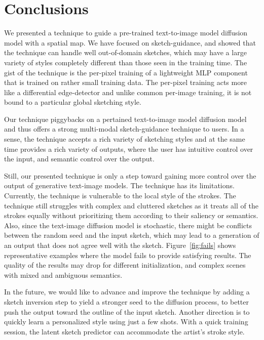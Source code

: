 \section{Conclusions}

We presented a technique to guide a pre-trained text-to-image model diffusion model with a spatial map. We have focused on sketch-guidance, and showed that the technique can handle well out-of-domain sketches, which may have a large variety of styles completely different than those seen in the training time. The gist of the technique is the per-pixel training of a lightweight MLP component that is trained on rather small training data. The per-pixel training acts more like a differential edge-detector and unlike common per-image training, it is not bound to a particular global sketching style.

Our technique piggybacks on a pertained text-to-image model diffusion model and thus offers a strong multi-modal sketch-guidance technique to users. In a sense, the technique accepts a rich variety of sketching styles and at the same time provides a rich variety of outputs, where the user has intuitive control over the input, and semantic control over the output.

Still, our presented technique is only a step toward gaining more control over the output of generative text-image models. The technique has its limitations. Currently, the technique is vulnerable to the local style of the strokes. The technique still struggles with complex and cluttered sketches as it treats all of the strokes equally without prioritizing them according to their saliency or semantics. Also, since the text-image diffusion model is stochastic, there might be conflicts between the random seed and the input sketch, which may lead to a generation of an output that does not agree well with the sketch. Figure~\ref{fig:fails} shows representative examples where the model fails to provide satisfying results. The quality of the results may drop for different initialization, and complex scenes with mixed and ambiguous semantics.

In the future, we would like to advance and improve the technique by adding a sketch inversion step to yield a stronger seed to the diffusion process, to better push the output toward the outline of the input sketch. Another direction is to quickly learn a personalized style using just a few shots. With a quick training session, the latent sketch predictor can accommodate the artist's stroke style.


